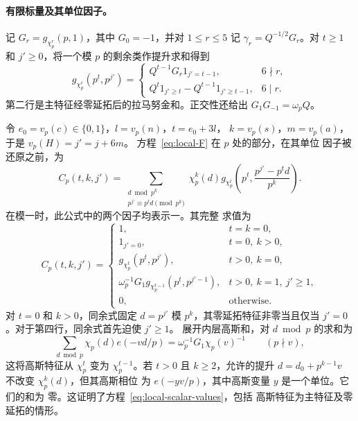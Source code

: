 \documentclass[11pt,a4paper]{article}
\numberwithin{equation}{section}
\numberwithin{figure}{section}
\theoremstyle{definition}
\theoremstyle{remark}
\begin{document}
\paragraph{有限标量及其单位因子。}
记 $G_r=g_{\chi_p^r}(p,1)$，其中 $G_0=-1$，并对
$1\le r\le5$ 记 $\gamma_r=Q^{-1/2}G_r$。对 $t\ge1$ 和
$j'\ge0$，将一个模 $p$ 的剩余类作提升求和得到
\[
 g_{\chi_p^r}(p^t,p^{j'})=
 \begin{cases}
 Q^{t-1}G_r1_{j'=t-1},&6\nmid r,\\
 Q^t1_{j'\ge t}-Q^{t-1}1_{j'\ge t-1},&6\mid r.
 \end{cases}
\]
第二行是主特征经零延拓后的拉马努金和。正交性还给出
$G_1G_{-1}=\omega_pQ$。

令 $e_0=v_p(c)\in\{0,1\}$，$l=v_p(n)$，$t=e_0+3l$，
$k=v_p(s)$，$m=v_p(a)$，于是 $v_p(H)=j'=j+6m$。
方程~\eqref{eq:local-F} 在 $p$ 处的部分，在其单位
因子被还原之前，为
\begin{equation}\label{eq:local-scalar-definition}
 C_p(t,k,j')=
 \sum_{\substack{d\bmod p^k\\p^{j'}\equiv p^td\pmod{p^k}}}
 \chi_p^k(d)
 g_{\chi_p^t}\!\left(p^t,\frac{p^{j'}-p^td}{p^k}\right).
\end{equation}
在模一时，此公式中的两个因子均表示一。其完整
求值为
\begin{equation}\label{eq:local-scalar-values}
 C_p(t,k,j')=
 \begin{cases}
 1,&t=k=0,\\
 1_{j'=0},&t=0,\ k>0,\\
 g_{\chi_p^t}(p^t,p^{j'}),&t>0,\ k=0,\\
 \omega_p^{-1}G_1g_{\chi_p^{t-1}}(p^t,p^{j'-1}),
                      &t>0,\ k=1,\ j'\ge1,\\
 0,&\text{otherwise}.
 \end{cases}
\end{equation}
对 $t=0$ 和 $k>0$，同余式固定 $d=p^{j'}$ 模
$p^k$，其零延拓特征非零当且仅当
$j'=0$。对于第四行，同余式首先迫使 $j'\ge1$。
展开内层高斯和，对 $d\bmod p$ 的求和为
\[
 \sum_{d\bmod p}\chi_p(d)e(-vd/p)
       =\omega_p^{-1}G_1\chi_p(v)^{-1}
       \qquad(p\nmid v),
\]
这将高斯特征从 $\chi_p^t$ 变为
$\chi_p^{t-1}$。若 $t>0$ 且 $k\ge2$，允许的提升
$d=d_0+p^{k-1}v$ 不改变 $\chi_p^k(d)$，但其高斯相位
为 $e(-yv/p)$，其中高斯变量 $y$ 是一个单位。它们的和为
零。这证明了方程~\eqref{eq:local-scalar-values}，包括
高斯特征为主特征及零延拓的情形。
\end{document}
